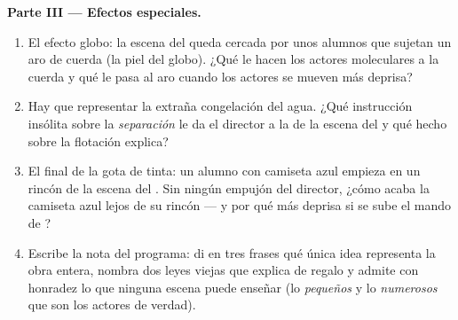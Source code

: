 \begin{problem}
\medskip\noindent\textbf{Parte III --- Efectos especiales.}
\begin{enumerate}[resume]
  \item El efecto globo: la escena del  queda cercada por unos
        alumnos que sujetan un aro de cuerda (la piel del globo). ¿Qué
        le hacen los actores moleculares a la cuerda y qué le pasa al
        aro cuando los actores se mueven más deprisa?
  \item Hay que representar la extraña congelación del agua. ¿Qué
        instrucción insólita sobre la \emph{separación} le da el
        director a la  de la escena del  y qué hecho
        sobre la flotación explica?
  \item El final de la gota de tinta: un alumno con camiseta azul
        empieza en un rincón de la escena del \emph{}. Sin
        ningún empujón del director, ¿cómo acaba la camiseta azul
        lejos de su rincón --- y por qué más deprisa si se sube el
        mando de ?
  \item Escribe la nota del programa: di en tres frases qué única
        idea representa la obra entera, nombra dos leyes viejas que
        explica de regalo y admite con honradez lo que ninguna escena
        puede enseñar (lo \emph{pequeños} y lo \emph{numerosos} que
        son los actores de verdad).
\end{enumerate}
\end{problem}
